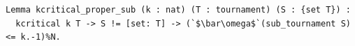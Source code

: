 \begin{lstlisting}[language=Rocq]
Lemma kcritical_proper_sub (k : nat) (T : tournament) (S : {set T}) :
  kcritical k T -> S != [set: T] -> (`$\bar\omega$`(sub_tournament S) <= k.-1)%N.
\end{lstlisting}
